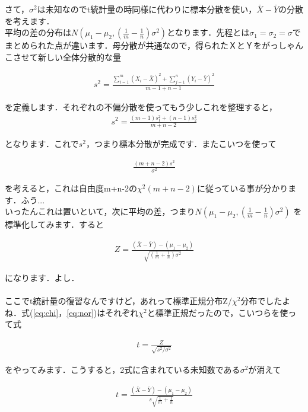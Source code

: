 \documentclass[11pt,a4paper]{ujreport} 	%
\begin{document}
さて，$\sigma^2$は未知なのでt統計量の時同様に代わりに標本分散を使い，$\bar{X}- \bar{Y}$の分散を考えます．\\

平均の差の分布は$N(\mu_1 -\mu_2, (\frac{1}{m} - \frac{1}{n})\sigma^2)$となります．先程とは$\sigma_1=\sigma_2=\sigma$でまとめられた点が違います．母分散が共通なので，得られたＸとＹをがっしゃんこさせて新しい全体分散的な量

\begin{align}
  s^2 = \frac{\sum_{i=1}^m (X_i-\bar{X})^2 + \sum_{j=1}^n (Y_i - \bar{Y})^2}{m-1 + n-1}
  \label{eq:combined-s}
\end{align}

を定義します．それぞれの不偏分散を使ってもう少しこれを整理すると，
\begin{align}
  s^2 = \frac{(m-1)s_1^2 + (n-1)s_2^2}{m+n-2}
  \label{eq:combined-s2}
\end{align}

となります．これで$s^2$，つまり標本分散が完成です．またこいつを使って

\begin{align}
  \frac{(m+n-2)s^2}{\sigma^2}
  \label{eq:chi}
\end{align}


を考えると，これは自由度m+n-2の$\chi^2(m+n-2)$に従っている事が分かります．ふう...\\

いったんこれは置いといて，次に平均の差，つまり$N(\mu_1 -\mu_2, (\frac{1}{m} - \frac{1}{n})\sigma^2)$
を標準化してみます．すると

\begin{align}
  Z= \frac{(\bar{X}- \bar{Y}) - (\mu_1 - \mu_2)}{\sqrt{(\frac{1}{m} + \frac{1}{n})\sigma^2}}
  \label{eq:nor}
\end{align}

になります．よし．\\
\\

ここでt統計量の復習なんですけど，あれって標準正規分布Z/$\chi^2$分布でしたよね．式(\ref{eq:chi}，\ref{eq:nor})はそれぞれ$\chi^2$と標準正規だったので，こいつらを使って式

\begin{align}
  t = \frac{Z}{\sqrt{s^2/\sigma^2}}
\end{align}

をやってみます．こうすると，2式に含まれている未知数である$\sigma^2$が消えて

\begin{align}
  t = \frac{(\bar{X}- \bar{Y}) - (\mu_1 - \mu_2)}{s\sqrt{\frac{1}{m} + \frac{1}{n}}}
\end{align}
\end{document}
